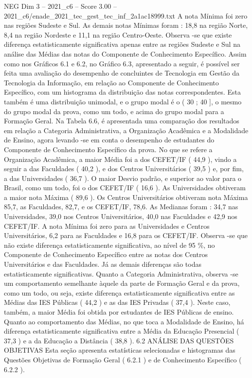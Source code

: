 \begin{textsample}{NEG Dim 3 – 2021\_c6 – Score 3.00 – 2021\_c6/enade\_2021\_tec\_gest\_tec\_inf\_2a1ac18999.txt}
A nota Mínima foi zero nas regiões Sudeste e Sul.
As demais notas Mínimas foram : 18,8 na região Norte, 8,4 na região Nordeste e 11,1 na região Centro-Oeste.
Observa -se que existe diferença estatisticamente significativa apenas entre as regiões Sudeste e Sul na análise das Médias das notas do Componente de Conhecimento Específico.
Assim como nos Gráficos 6.1 e 6.2, no Gráfico 6.3, apresentado a seguir, é possível ser feita uma avaliação do desempenho de concluintes de Tecnologia em Gestão da Tecnologia da Informação, em relação ao Componente de Conhecimento Específico, com um histograma da distribuição das notas correspondentes.
Esta também é uma distribuição unimodal, e o grupo modal é o ( 30 ; 40 ], o mesmo do grupo modal da prova, como um todo, e acima do grupo modal para a Formação Geral.
Na Tabela 6.6, é apresentada uma comparação dos resultados em relação a Categoria Administrativa, a Organização Acadêmica e a Modalidade de Ensino, agora levando -se em conta o desempenho de estudantes do Componente de Conhecimento Específico da prova.
No que se refere a Organização Acadêmica, a maior Média foi a dos CEFET/IF ( 44,9 ), vindo a seguir a das Faculdades ( 40,2 ), e dos Centros Universitários ( 39,5 ) e, por fim, a das Universidades ( 36,7 ).
O maior Desvio padrão, e superior ao valor para o Brasil, como um todo, foi o dos CEFET/IF ( 16,6 ).
As Universidades obtiveram a maior nota Máxima ( 89,6 ).
Os Centros Universitários obtiveram nota Máxima 85,7, as Faculdades, 82,7, e os CEFET/IF, 78,6.
As Medianas foram : 34,7 nas Universidades, 39,0 nos Centros Universitários, 40,0 nas Faculdades e 42,9 nos CEFET/IF.
A nota Mínima foi zero para as Universidades e Centros Universitários, 6,2 para as Faculdades e 16,8 para os CEFET/IF.
Observa -se que não existe diferença estatisticamente significativa, ao nível de 95 \%, no Componente de Conhecimento Específico entre as notas dos Centros Universitários e das Faculdades.
Já as demais diferenças são todas estatisticamente significativas.
Quanto a Categoria Administrativa, observa -se um comportamento semelhante àquele da parte de Formação Geral e da prova, como um todo, ou seja, existe diferença estatisticamente significativa entre as Médias das IES Públicas ( 44,2 ) e as das IES Privadas ( 37,4 ).
Neste caso, também, a maior Média foi obtida por estudantes de IES Públicas de ensino.
Quanto ao comportamento das Médias, no que toca a Modalidade de Ensino, há diferença estatisticamente significativa entre a Média da Educação Presencial ( 37,3 ) e a da Educação a Distância ( 38,8 ). 6.2 ANÁLISE DAS QUESTÕES OBJETIVAS Esta seção apresenta estatísticas selecionadas e histogramas das Questões Objetivas de Formação Geral ( 6.2.1 ) e de Conhecimento Específico ( 6.2.2 ).

\end{textsample}
